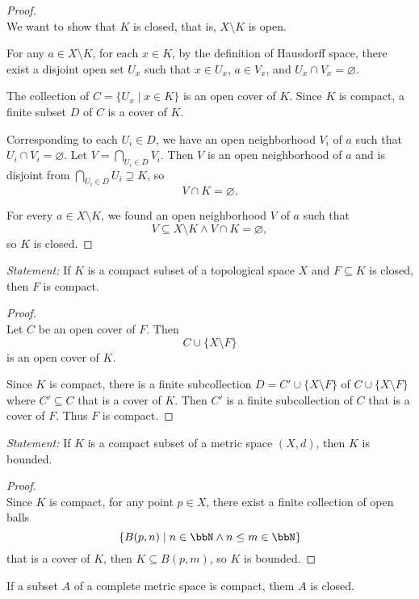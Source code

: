 \documentclass[a4paper,12pt]{article}
\begin{document}
\begin{proof}\mbox{}\\
We want to show that $K$ is closed, that is, $X\setminus K$ is open.

For any $a\in X\setminus K$, for each $x\in K$, by the definition of Hausdorff space, there exist a disjoint open set $U_x$ such that $x\in U_x$, $a\in V_x$, and $U_x\cap V_x=\varnothing$.

The collection of $C=\{U_x\mid x\in K\}$ is an open cover of $K$. Since $K$ is compact, a finite subset $D$ of $C$ is a cover of $K$.

Corresponding to each $U_i\in D$, we have an open neighborhood $V_i$ of $a$ such that $U_i\cap V_i=\varnothing$. Let $V=\bigcap_{U_i\in D}V_i$. Then $V$ is an open neighborhood of $a$ and is disjoint from $\bigcap_{U_i\in D}U_i\supseteq K$, so
\[V\cap K=\varnothing.\]

For every $a\in X\setminus K$, we found an open neighborhood $V$ of $a$ such that
\[V\subseteq X\setminus K\land V\cap K=\varnothing,\]
so $K$ is closed.
\end{proof}
\textit{Statement:} If $K$ is a compact subset of a topological space $X$ and $F\subseteq K$ is closed, then $F$ is compact.

\begin{proof}\mbox{}\\
Let $C$ be an open cover of $F$. Then
\[C\cup\{X\setminus F\}\]
is an open cover of $K$.

Since $K$ is compact, there is a finite subcollection $D=C'\cup\{X\setminus F\}$ of $C\cup\{X\setminus F\}$ where $C'\subseteq C$ that is a cover of $K$. Then $C'$ is a finite subcollection of $C$ that is a cover of $F$. Thus $F$ is compact.
\end{proof}
\textit{Statement:} If $K$ is a compact subset of a metric space $(X,d)$, then $K$ is bounded.

\begin{proof}\mbox{}\\
Since $K$ is compact, for any point $p\in X$, there exist a finite collection of open balls
\[\{B(p,n)\mid n\in\bbN\land n\leq m\in\bbN\}\]
that is a cover of $K$, then $K\subseteq B(p,m)$, so $K$ is bounded.
\end{proof}
 If a subset $A$ of a complete metric space is compact, them $A$ is closed.
\end{document}
